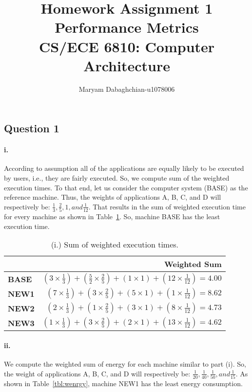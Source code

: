 \documentclass[12pt]{article}
\title{Homework Assignment 1\\
	Performance Metrics\\
	CS/ECE 6810: Computer Architecture}
\author{Maryam Dabaghchian-u1078006}
\newcommand{\q}[1]{\subsection*{Question {#1}}}
\newcommand{\partt}[1]{\paragraph*{{#1}.}}
\begin{document}
\maketitle

\q{1} 

\partt{i} According to assumption all of the applications are equally likely to be 
executed by users, i.e., they are fairly executed. So, we compute sum of the 
weighted execution times. To that end, let us consider the computer system (BASE) 
as the reference machine. Thus, the weights of applications A, B, C, and D will 
respectively be: $\frac{1}{3}, \frac{2}{5}, 1, and \frac{1}{12}$. That results in 
the sum of weighted execution time for every machine as shown in 
Table~\ref{tbl:wext}. So, machine BASE has the least execution time. 

\begin{table}[h]
\center
\begin{tabular}{|l|r|}
	\hline
	 & \textbf{Weighted Sum} \\
	\hline
	\textbf{BASE} & $(3 \times \frac{1}{3}) + (\frac{5}{2} \times \frac{2}{5}) + 
	(1 \times 1) + (12 \times \frac{1}{12}) = 4.00$  \\
	\hline
	\textbf{NEW1} & $(7 \times \frac{1}{3}) + (3 \times \frac{2}{5}) + 
	(5 \times 1) + (1 \times \frac{1}{12}) = 8.62$ \\
	\hline
	\textbf{NEW2} & $(2 \times \frac{1}{3}) + (1 \times \frac{2}{5}) + 
	(3 \times 1) + (8 \times \frac{1}{12}) = 4.73$ \\
	\hline
	\textbf{NEW3} & $(1 \times \frac{1}{3}) + (3 \times \frac{2}{5}) + 
	(2 \times 1) + (13 \times \frac{1}{12}) = 4.62$ \\
	\hline
\end{tabular}
\caption{(i.) Sum of weighted execution times.}
\label{tbl:wext}
\end{table}


\partt{ii} We compute the weighted sum of energy for each machine similar to 
part (i). So, the weight of applications A, B, C, and D will respectively be: 
$\frac{1}{20}, \frac{1}{40}, \frac{1}{50}, and \frac{1}{15}$. As shown in 
Table~\ref{tbl:wenrgy}, machine NEW1 has the least energy consumption.
\end{document}
